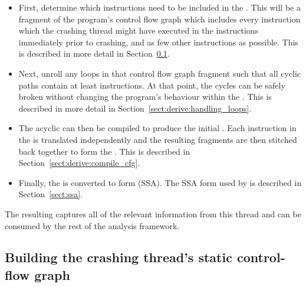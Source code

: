 \begin{itemize}
\item First, determine which instructions need to be included in the
  {\StateMachine}.  This will be a fragment of the program's control
  flow graph which includes every instruction which the crashing
  thread might have executed in the \backref{$\alpha$} instructions
  immediately prior to crashing, and as few other instructions as
  possible.  This is described in more detail in
  Section~\ref{sect:derive:build_static_cfg}.
\item Next, unroll any loops in that control flow graph fragment such
  that all cyclic paths contain at least \backref{$\alpha$}
  instructions.  At that point, the cycles can be safely broken
  without changing the program's behaviour within the
  .  This is described in more detail in
  Section~\ref{sect:derive:handling_loops}.
\item The acyclic  can then be compiled to produce the
  initial {\StateMachine}.  Each instruction in the  is
  translated independently and the resulting fragments are then
  stitched back together to form the {\StateMachine}.  This is
  described in Section~\ref{sect:derive:compile_cfg}.
\item Finally, the {\StateMachine} is converted to
   form (SSA).  The SSA form
  used by {\technique} is described in Section~\ref{sect:ssa}.
\end{itemize}

The resulting {\StateMachine} captures all of the relevant information
from this thread and can be consumed by the rest of the analysis
framework.

\subsection{Building the crashing thread's static control-flow graph}
\label{sect:derive:build_static_cfg}

